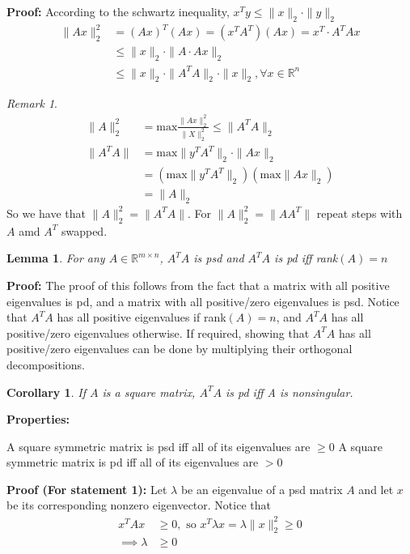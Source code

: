 \documentclass[titlepage]{article}
\theoremstyle{plain}
\newtheorem{lem}[thm]{Lemma}
\newtheorem*{cor}{Corollary}
\theoremstyle{definition}
\theoremstyle{remark}
\newtheorem*{rem}{Remark}
\begin{document}
\noindent \textbf{Proof: } According to the schwartz inequality, $x^Ty \leq
\|x\|_2 \cdot \|y\|_2$
\begin{align*}
\|Ax\|_2^2 &= (Ax)^T(Ax) = (x^TA^T)(Ax) = x^T \cdot A^TAx\\
&\leq \|x\|_2  \cdot \|A\cdot  Ax\|_2\\
&\leq \|x\|_2 \cdot \|A^T A\|_2 \cdot \|x\|_2, \forall x \in \mathbb{R}^n
\end{align*}
\begin{rem}
\begin{align*}
\|A\|_2^2 &= \text{max}\frac{\|Ax\|_2^2}{\|X\|_2^2} \leq \|A^TA\|_2\\
\|A^TA\| &=\text{max} \|y^T A^T\|_2 \cdot \|Ax\|_2\\
&=(\text{max} \|y^TA^T\|_2)(\text{max}\|Ax\|_2)\\
&= \|A\|_2
\end{align*}
So we have that $\|A\|_2^2 = \|A^TA\|$. For $\|A\|_2^2= \|A A^T\|$ repeat steps
with $A$ amd $A^T$ swapped.
\end{rem}
\begin{lem}
For any $A \in \mathbb{R}^{m \times n}$, $A^TA$ is psd and $A^TA$ is pd iff
rank$(A) = n$
\end{lem}
\textbf{Proof: } The proof of this follows from the fact that a matrix with all positive
eigenvalues is pd, and a matrix with all positive/zero eigenvalues is psd.
Notice that $A^TA$ has all positive eigenvalues if rank$(A) = n$, and $A^TA$ has
all positive/zero eigenvalues otherwise. If required, showing that $A^TA$ has
all positive/zero eigenvalues can be done by multiplying their orthogonal
decompositions.
\begin{cor}
If $A$ is a square matrix, $A^TA$ is pd iff A is nonsingular.
\end{cor}
\textbf{Properties: }
\begin{outline}[enumerate]
\1 A square symmetric matrix is psd iff all of its eigenvalues are $\geq 0$
\1 A square symmetric matrix is pd iff all of its eigenvalues are $> 0$
\end{outline}
\textbf{Proof (For statement 1): } Let $\lambda$ be an eigenvalue of a psd
matrix $A$ and let $x$ be its corresponding nonzero eigenvector. Notice that
\begin{align*}
x^T A x &\geq 0, \text{ so } x^T \lambda x = \lambda \|x\|_2^2 \geq 0\\
\implies \lambda &\geq 0
\end{align*}
\end{document}
